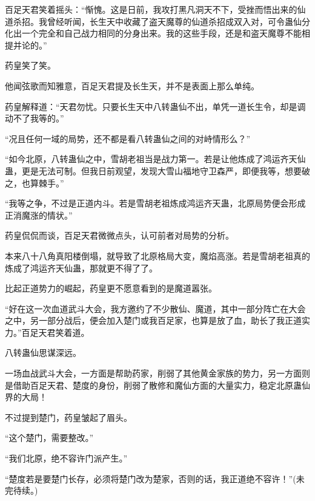 \begin{this_body}
百足天君笑着摇头：“惭愧。这是日前，我攻打黑凡洞天不下，受挫而悟出来的仙道杀招。我曾经听闻，长生天中收藏了盗天魔尊的仙道杀招成双入对，可令蛊仙分化出一个完全和自己战力相同的分身出来。我的这些手段，还是和盗天魔尊不能相提并论的。”

药皇笑了笑。

他闻弦歌而知雅意，百足天君提及长生天，并不是表面上那么单纯。

药皇解释道：“天君勿忧。只要长生天中八转蛊仙不出，单凭一道长生令，却是调动不了我等的。”

“况且任何一域的局势，还不都是看八转蛊仙之间的对峙情形么？”

“如今北原，八转蛊仙之中，雪胡老祖当是战力第一。若是让他炼成了鸿运齐天仙蛊，更是无法可制。但我日前观望，发现大雪山福地守卫森严，即便我等，想要破之，也算棘手。”

“我等之争，不过是正道内斗。若是雪胡老祖炼成鸿运齐天蛊，北原局势便会形成正消魔涨的情状。”

药皇侃侃而谈，百足天君微微点头，认可前者对局势的分析。

本来八十八角真阳楼倒塌，就导致了北原格局大变，魔焰高涨。若是雪胡老祖真的炼成了鸿运齐天仙蛊，那就更不得了了。

比起正道势力的崛起，药皇更不愿意看到的是魔道嚣张。

“好在这一次血道武斗大会，我方邀约了不少散仙、魔道，其中一部分阵亡在大会之中，另一部分战后，便会加入楚门或我百足家，也算是放了血，助长了我正道实力。”百足天君笑着道。

八转蛊仙思谋深远。

一场血战武斗大会，一方面是帮助药家，削弱了其他黄金家族的势力，另一方面则是借助百足天君、楚度的身份，削弱了散修和魔仙方面的大量实力，稳定北原蛊仙界的大局！

不过提到楚门，药皇皱起了眉头。

“这个楚门，需要整改。”

“我们北原，绝不容许门派产生。”

“楚度若是要楚门长存，必须将楚门改为楚家，否则的话，我正道绝不容许！”(未完待续。)

\end{this_body}

